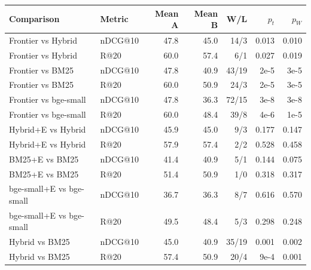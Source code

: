 \begin{tabular}{llrrrrr}
\toprule
Comparison & Metric & Mean A & Mean B & W/L & $p_t$ & $p_W$ \\
\midrule
Frontier vs Hybrid & nDCG@10 & 47.8 & 45.0 & 14/3 & 0.013 & 0.010 \\
Frontier vs Hybrid & R@20 & 60.0 & 57.4 & 6/1 & 0.027 & 0.019 \\
Frontier vs BM25 & nDCG@10 & 47.8 & 40.9 & 43/19 & 2e-5 & 3e-5 \\
Frontier vs BM25 & R@20 & 60.0 & 50.9 & 24/3 & 2e-5 & 3e-5 \\
Frontier vs bge-small & nDCG@10 & 47.8 & 36.3 & 72/15 & 3e-8 & 3e-8 \\
Frontier vs bge-small & R@20 & 60.0 & 48.4 & 39/8 & 4e-6 & 1e-5 \\
Hybrid{+}E vs Hybrid & nDCG@10 & 45.9 & 45.0 & 9/3 & 0.177 & 0.147 \\
Hybrid{+}E vs Hybrid & R@20 & 57.9 & 57.4 & 2/2 & 0.528 & 0.458 \\
BM25{+}E vs BM25 & nDCG@10 & 41.4 & 40.9 & 5/1 & 0.144 & 0.075 \\
BM25{+}E vs BM25 & R@20 & 51.4 & 50.9 & 1/0 & 0.318 & 0.317 \\
bge-small{+}E vs bge-small & nDCG@10 & 36.7 & 36.3 & 8/7 & 0.616 & 0.570 \\
bge-small{+}E vs bge-small & R@20 & 49.5 & 48.4 & 5/3 & 0.298 & 0.248 \\
Hybrid vs BM25 & nDCG@10 & 45.0 & 40.9 & 35/19 & 0.001 & 0.002 \\
Hybrid vs BM25 & R@20 & 57.4 & 50.9 & 20/4 & 9e-4 & 0.001 \\
\bottomrule
\end{tabular}
